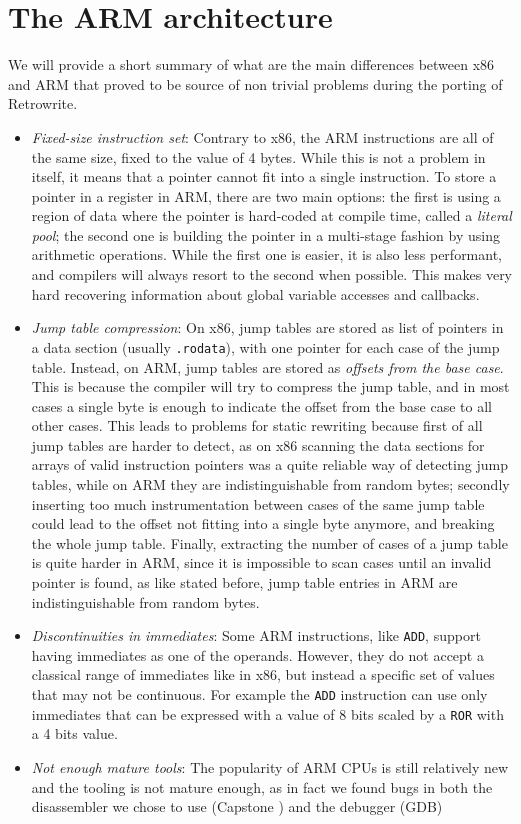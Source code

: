 \documentclass[a4paper,11pt,oneside]{report}
\begin{document}
\section{The ARM architecture}
We will provide a short summary of what are the main differences between x86 
and ARM that proved to be source of non trivial problems during the porting of 
Retrowrite.
\begin{itemize}
	\item \emph{Fixed-size instruction set}: Contrary to x86, the ARM 
		instructions are all of the same size, fixed to the value of 4 bytes.  
		While this is not a problem in itself, it means that a pointer cannot 
		fit into a single instruction. To store a pointer in a register in ARM, 
		there are two main options: the first is using a region of data where 
		the pointer is hard-coded at compile time, called a \emph{literal 
		pool}; the second one is building the pointer in a multi-stage fashion 
		by using arithmetic operations.  While the first one is easier, it is 
		also less performant, and compilers will always resort to the second 
		when possible. This makes very hard recovering information about global 
		variable accesses and callbacks.
	\item \emph{Jump table compression}: On x86, jump tables are stored as list 
		of pointers in a data section (usually \texttt{.rodata}), with one 
		pointer for each case of the jump table. Instead, on ARM, jump tables 
		are stored as \emph{offsets from the base case}. This is because the 
		compiler will try to compress the jump table, and in most cases a 
		single byte is enough to indicate the offset from the base case to all 
		other cases. This leads to problems for static rewriting because first 
		of all jump tables are harder to detect, as on x86 scanning the data 
		sections for arrays of valid instruction pointers was a quite reliable 
		way of detecting jump tables, while on ARM they are indistinguishable 
		from random bytes; secondly inserting too much instrumentation between 
		cases of the same jump table could lead to the offset not fitting into 
		a single byte anymore, and breaking the whole jump table. Finally, 
		extracting the number of cases of a jump table is quite harder in ARM, 
		since it is impossible to scan cases until an invalid pointer is found, 
		as like stated before, jump table entries in ARM are indistinguishable 
		from random bytes.
	\item \emph{Discontinuities in immediates}: Some ARM instructions, like 
		\texttt{ADD}, support having immediates as one of the operands.  
		However, they do not accept a classical range of immediates like in 
		x86, but instead a specific set of values that may not be continuous.  
		For example the \texttt{ADD} instruction can use only immediates that 
		can be expressed with a value of 8 bits scaled by a \texttt{ROR} with a
		4 bits value.
	\item \emph{Not enough mature tools}: The popularity of ARM CPUs is still 
		relatively new and the tooling is not mature enough, as in fact we 
		found bugs in both the disassembler we chose to use (Capstone 
		\cite{capstone}) and the debugger (GDB)
\end{itemize}
\end{document}
